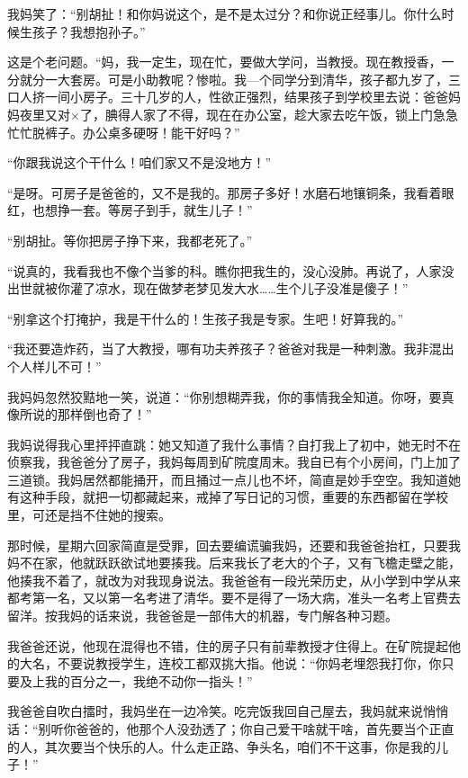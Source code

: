  我妈笑了：“别胡扯！和你妈说这个，是不是太过分？和你说正经事儿。你什么时候生孩子？我想抱孙子。” 
 
 这是个老问题。“妈，我一定生，现在忙，要做大学问，当教授。现在教授香，一分就分一大套房。可是小助教呢？惨啦。我—个同学分到清华，孩子都九岁了，三口人挤一间小房子。三十几岁的人，性欲正强烈，结果孩子到学校里去说：爸爸妈妈夜里又对×了，腆得人家了不得，现在在办公室，趁大家去吃午饭，锁上门急急忙忙脱裤子。办公桌多硬呀！能干好吗？” 
 
 “你跟我说这个干什么！咱们家又不是没地方！” 
 
 “是呀。可房子是爸爸的，又不是我的。那房子多好！水磨石地镶铜条，我看着眼红，也想挣一套。等房子到手，就生儿子！” 
 
 “别胡扯。等你把房子挣下来，我都老死了。” 
 
 “说真的，我看我也不像个当爹的科。瞧你把我生的，没心没肺。再说了，人家没出世就被你灌了凉水，现在做梦老梦见发大水……生个儿子没准是傻子！” 
 
 “别拿这个打掩护，我是干什么的！生孩子我是专家。生吧！好算我的。” 
 
 “我还要造炸药，当了大教授，哪有功夫养孩子？爸爸对我是一种刺激。我非混出个人样儿不可！” 
 
 我妈妈忽然狡黠地一笑，说道：“你别想糊弄我，你的事情我全知道。你呀，要真像所说的那样倒也奇了！” 
 
 我妈说得我心里抨抨直跳：她又知道了我什么事情？自打我上了初中，她无时不在侦察我，我爸爸分了房子，我妈每周到矿院度周末。我自已有个小房间，门上加了三道锁。我妈居然都能捅开，而且捅过一点儿也不坏，简直是妙手空空。我知道她有这种手段，就把一切都藏起来，戒掉了写日记的习惯，重要的东西都留在学校里，可还是挡不住她的搜索。 
 
 那时候，星期六回家简直是受罪，回去要编谎骗我妈，还要和我爸爸抬杠，只要我妈不在家，他就跃跃欲试地要揍我。后来我长了老大的个子，又有飞檐走壁之能，他揍我不着了，就改为对我现身说法。我爸爸有一段光荣历史，从小学到中学从来都考第一名，又以第一名考进了清华。要不是得了一场大病，准头一名考上官费去留洋。按我妈的话来说，我爸爸是一部伟大的机器，专门解各种习题。 
 
 我爸爸还说，他现在混得也不错，住的房子只有前辈教授才住得上。在矿院提起他的大名，不要说教授学生，连校工都双挑大指。他说：“你妈老埋怨我打你，你只要及上我的百分之一，我绝不动你一指头！” 
 
 我爸爸自吹白擂时，我妈坐在一边冷笑。吃完饭我回自己屋去，我妈就来说悄悄话：“别听你爸爸的，他那个人没劲透了；你自己爱干啥就干啥，首先要当个正直的人，其次要当个快乐的人。什么走正路、争头名，咱们不干这事，你是我的儿子！” 
 
